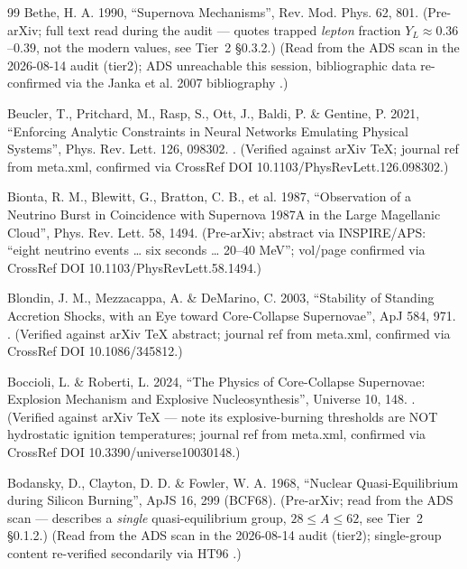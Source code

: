 \begin{thebibliography}{99}
Bethe, H. A. 1990, ``Supernova Mechanisms'', Rev. Mod. Phys. 62, 801. (Pre-arXiv; full text read during the audit --- quotes trapped \emph{lepton} fraction $Y_L \approx 0.36$--$0.39$, not the modern \Ye{} values, see Tier~2 \S 0.3.2.) (Read from the ADS scan in the 2026-08-14 audit (tier2); ADS unreachable this session, bibliographic data re-confirmed via the Janka et al. 2007 bibliography .)

Beucler, T., Pritchard, M., Rasp, S., Ott, J., Baldi, P. \& Gentine, P. 2021, ``Enforcing Analytic Constraints in Neural Networks Emulating Physical Systems'', Phys. Rev. Lett. 126, 098302. . (Verified against arXiv TeX; journal ref from meta.xml, confirmed via CrossRef DOI 10.1103/PhysRevLett.126.098302.)

Bionta, R. M., Blewitt, G., Bratton, C. B., et al. 1987, ``Observation of a Neutrino Burst in Coincidence with Supernova 1987A in the Large Magellanic Cloud'', Phys. Rev. Lett. 58, 1494. (Pre-arXiv; abstract via INSPIRE/APS: ``eight neutrino events \ldots{} six seconds \ldots{} 20--40 MeV''; vol/page confirmed via CrossRef DOI 10.1103/PhysRevLett.58.1494.)

Blondin, J. M., Mezzacappa, A. \& DeMarino, C. 2003, ``Stability of Standing Accretion Shocks, with an Eye toward Core-Collapse Supernovae'', ApJ 584, 971. . (Verified against arXiv TeX abstract; journal ref from meta.xml, confirmed via CrossRef DOI 10.1086/345812.)

Boccioli, L. \& Roberti, L. 2024, ``The Physics of Core-Collapse Supernovae: Explosion Mechanism and Explosive Nucleosynthesis'', Universe 10, 148. . (Verified against arXiv TeX  --- note its explosive-burning thresholds are NOT hydrostatic ignition temperatures; journal ref from meta.xml, confirmed via CrossRef DOI 10.3390/universe10030148.)

Bodansky, D., Clayton, D. D. \& Fowler, W. A. 1968, ``Nuclear Quasi-Equilibrium during Silicon Burning'', ApJS 16, 299 (BCF68). (Pre-arXiv; read from the ADS scan --- describes a \emph{single} quasi-equilibrium group, $28 \le A \le 62$, see Tier~2 \S 0.1.2.) (Read from the ADS scan in the 2026-08-14 audit (tier2); single-group content re-verified secondarily via HT96 .)


\end{thebibliography}
